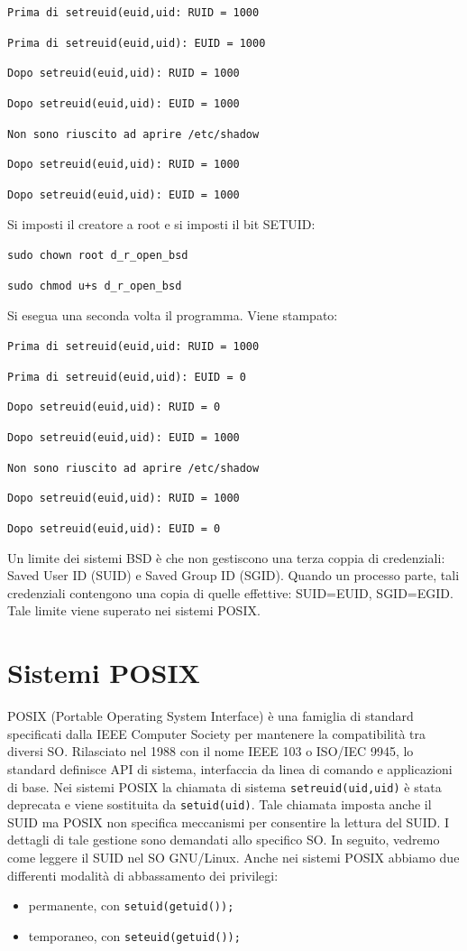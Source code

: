 \texttt{Prima di setreuid(euid,uid: RUID = 1000}

\texttt{Prima di setreuid(euid,uid): EUID = 1000
}

\texttt{Dopo setreuid(euid,uid): RUID = 1000 }

\texttt{Dopo setreuid(euid,uid): EUID = 1000}

\texttt{Non sono riuscito ad aprire /etc/shadow}

\texttt{Dopo setreuid(euid,uid): RUID = 1000}

\texttt{Dopo setreuid(euid,uid): EUID = 1000}

Si imposti il creatore a root e si imposti il bit SETUID:

\begin{center}
    \texttt{sudo chown root d\_r\_open\_bsd}
    
    \texttt{sudo chmod u+s d\_r\_open\_bsd}
\end{center}
Si esegua una seconda volta il programma. Viene stampato:

\texttt{Prima di setreuid(euid,uid: RUID = 1000}

\texttt{Prima di setreuid(euid,uid): EUID = 0}

\texttt{Dopo setreuid(euid,uid): RUID = 0 }

\texttt{Dopo setreuid(euid,uid): EUID = 1000}

\texttt{Non sono riuscito ad aprire /etc/shadow}

\texttt{Dopo setreuid(euid,uid): RUID = 1000}

\texttt{Dopo setreuid(euid,uid): EUID = 0}

Un limite dei sistemi BSD è che non gestiscono una terza coppia di credenziali: Saved User ID (SUID) e Saved Group ID (SGID). Quando un processo parte, tali credenziali contengono una copia di quelle effettive: SUID=EUID, SGID=EGID. Tale limite viene superato nei sistemi POSIX.

\section{Sistemi POSIX}
POSIX (Portable Operating System Interface) è
una famiglia di standard specificati dalla IEEE
Computer Society per mantenere la
compatibilità tra diversi SO. Rilasciato nel 1988 con il nome IEEE 103 o
ISO/IEC 9945, lo standard definisce API di sistema, interfaccia da linea di comando e applicazioni di base. Nei sistemi POSIX la chiamata di sistema
\texttt{setreuid(uid,uid)} è stata deprecata e
viene sostituita da \texttt{setuid(uid)}. Tale chiamata imposta anche il SUID ma POSIX non specifica meccanismi per consentire
la lettura del SUID. I dettagli di tale gestione sono demandati allo
specifico SO. In seguito, vedremo come leggere il SUID nel SO
GNU/Linux. Anche nei sistemi POSIX abbiamo due
differenti modalità di abbassamento dei
privilegi:
\begin{itemize}
    \item permanente, con \texttt{setuid(getuid());}
    \item temporaneo, con \texttt{seteuid(getuid());}
\end{itemize}


